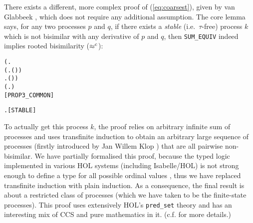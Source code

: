 There exists a different, more complex proof of (\ref{eq:coarsest}),
given by van Glabbeek \cite{van2005characterisation}, which does not
require any additional assumption.
The core lemma says, for
any two processes $p$ and $q$, if there exists a \emph{stable} (i.e.~$\tau$-free)
 process $k$ which is not bisimilar with any derivative of $p$ and
 $q$, then \texttt{SUM_EQUIV} indeed implies rooted bisimilarity ($\mathrel{\approx^{\rm{c}}}$):
\begin{alltt}
\HOLTokenTurnstile{} (\HOLSymConst{\HOLTokenExists{}}.
          \HOLSymConst{\HOLTokenConj{}} (\HOLSymConst{\HOLTokenForall{}} .  \HOLTokenWeakTransBegin{}\HOLTokenWeakTransEnd {} \HOLSymConst{\HOLTokenImp{}} \HOLSymConst{\HOLTokenNeg{}}( \HOLSymConst{\HOLTokenWeakEQ} )) \HOLSymConst{\HOLTokenConj{}}
        \HOLSymConst{\HOLTokenForall{}} .  \HOLTokenWeakTransBegin{}\HOLTokenWeakTransEnd {} \HOLSymConst{\HOLTokenImp{}} \HOLSymConst{\HOLTokenNeg{}}( \HOLSymConst{\HOLTokenWeakEQ} )) \HOLSymConst{\HOLTokenImp{}}
   (\HOLSymConst{\HOLTokenForall{}}.  \HOLSymConst{\ensuremath{+}}  \HOLSymConst{\HOLTokenWeakEQ}  \HOLSymConst{\ensuremath{+}} ) \HOLSymConst{\HOLTokenImp{}}
    \HOLSymConst{\HOLTokenObsCongr} \hfill{[PROP3_COMMON]}
\end{alltt}
\begin{alltt}
  \HOLSymConst{\HOLTokenEquiv{}} \HOLSymConst{\HOLTokenForall{}} .  \HOLTokenTransBegin{}\HOLTokenTransEnd {} \HOLSymConst{\HOLTokenImp{}}  \HOLSymConst{\HOLTokenNotEqual{}} \HOLSymConst{\ensuremath{\tau}}\hfill{[STABLE]}
\end{alltt}
To actually get this process $k$, the proof relies on arbitrary infinite sum of 
processes and uses transfinite induction to obtain
an arbitrary large sequence of processes (firstly introduced by Jan
Willem Klop \cite{van2005characterisation})
 that are all pairwise non-bisimilar.
We have partially formalised
this proof, because the typed logic
implemented in various HOL systems (including Isabelle/HOL) is not
strong enough to define a type for all possible ordinal values
\cite{norrish2013ordinals}, thus
we have replaced transfinite induction with plain induction. As a
consequence, the final
result is about a restricted class of processes (which we have taken
to be the finite-state processes). This proof uses extensively HOL's
\texttt{pred_set} theory \cite{melham1992hol} and has an interesting mix
of CCS and pure mathematics in it. (c.f. \cite{Tian:2017wrba} for
more details.)
